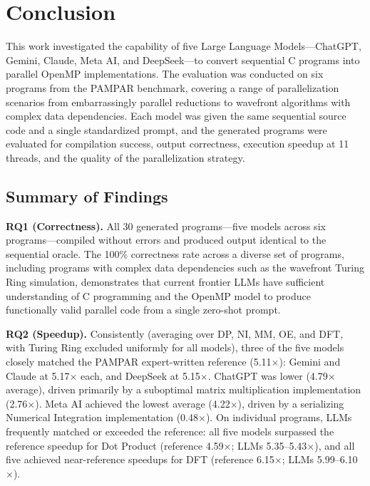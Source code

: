 \chapter{Conclusion}\label{cap:conclusao}

This work investigated the capability of five Large Language Models—ChatGPT, Gemini, Claude, Meta AI, and DeepSeek—to convert sequential C programs into parallel OpenMP implementations. 
The evaluation was conducted on six programs from the PAMPAR benchmark, covering a range of parallelization scenarios from embarrassingly parallel reductions to wavefront algorithms with complex data dependencies. 
Each model was given the same sequential source code and a single standardized prompt, and the generated programs were evaluated for compilation success, output correctness, execution speedup at 11 threads, and the quality of the parallelization strategy.

\section{Summary of Findings}
\label{sec:conclusion_summary}

\textbf{RQ1 (Correctness).} All 30 generated programs—five models across six programs—compiled without errors and produced output identical to the sequential oracle. 
The 100\% correctness rate across a diverse set of programs, including programs with complex data dependencies such as the wavefront Turing Ring simulation, demonstrates that current frontier LLMs have sufficient understanding of C programming and the OpenMP model to produce functionally valid parallel code from a single zero-shot prompt.

\textbf{RQ2 (Speedup).} Consistently (averaging over DP, NI, MM, OE, and DFT, with Turing Ring excluded uniformly for all models), three of the five models closely matched the PAMPAR expert-written reference (5.11$\times$): Gemini and Claude at 5.17$\times$ each, and DeepSeek at 5.15$\times$. ChatGPT was lower (4.79$\times$ average), driven primarily by a suboptimal matrix multiplication implementation (2.76$\times$). 
Meta AI achieved the lowest average (4.22$\times$), driven by a serializing Numerical Integration implementation (0.48$\times$). 
On individual programs, LLMs frequently matched or exceeded the reference: all five models surpassed the reference speedup for Dot Product (reference 4.59$\times$; LLMs 5.35--5.43$\times$), and all five achieved near-reference speedups for DFT (reference 6.15$\times$; LLMs 5.99--6.10$\times$).

